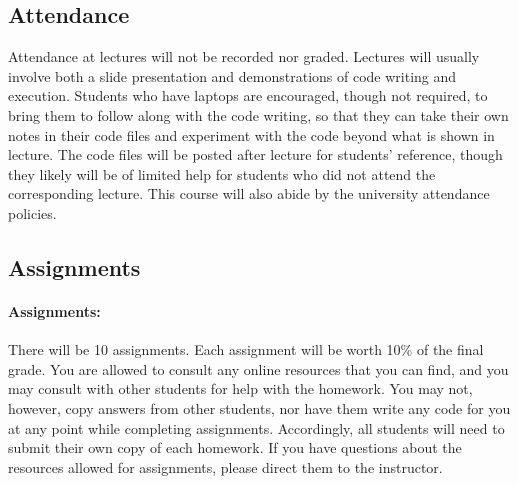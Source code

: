 \documentclass[11pt]{article}
\begin{document}
\subsection*{Attendance}
Attendance at lectures will not be recorded nor graded. Lectures will usually involve both a slide presentation and demonstrations of code writing and execution. Students who have laptops are encouraged, though not required, to bring them to follow along with the code writing, so that they can take their own notes in their code files and experiment with the code beyond what is shown in lecture. The code files will be posted after lecture for students’ reference, though they likely will be of limited help for students who did not attend the corresponding lecture. This course will also abide by the university attendance policies.

\pagebreak

\subsection*{Assignments}
	
\paragraph{Assignments:}
There will be 10 assignments. Each assignment will be worth 10\% of the final grade. You are allowed to consult any online resources that you can find, and you may consult with other students for help with the homework. You may not, however, copy answers from other students, nor have them write any code for you at any point while completing assignments. Accordingly, all students will need to submit their own copy of each homework. If you have questions about the resources allowed for assignments, please direct them to the instructor. 
	
	
\end{document}
